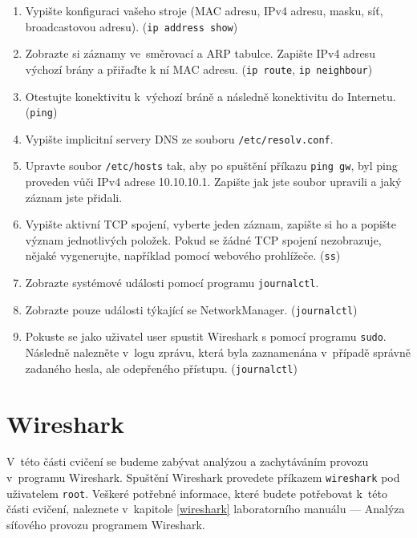 \begin{enumerate}
\item Vypište konfiguraci vašeho stroje (MAC adresu, IPv4 adresu, masku, síť,
  broadcastovou adresu). ({\tt ip address show})
\item Zobrazte si záznamy ve~směrovací a ARP tabulce. Zapište IPv4 adresu
  výchozí brány a přiřaďte k ní MAC adresu. ({\tt ip route}, {\tt ip neighbour})
\item Otestujte konektivitu k~výchozí bráně a následně konektivitu do Internetu.
  ({\tt ping})
\item Vypište implicitní servery DNS ze souboru {\tt /etc/resolv.conf}.
\item Upravte soubor {\tt /etc/hosts} tak, aby po spuštění příkazu \texttt{ping gw}, byl ping proveden vůči IPv4 adrese 10.10.10.1. Zapište jak jste soubor upravili a jaký záznam jste přidali.
\item Vypište aktivní TCP spojení, vyberte jeden záznam, zapište si ho a popište
  význam jednotlivých položek. Pokud se žádné TCP spojení nezobrazuje, nějaké
    vygenerujte, například pomocí webového prohlížeče. ({\tt ss})
\item Zobrazte systémové události pomocí programu \texttt{journalctl}.
\item Zobrazte pouze události týkající se NetworkManager. (\texttt{journalctl})
\item Pokuste se jako uživatel user spustit Wireshark s pomocí programu \texttt{sudo}. Následně nalezněte v~logu zprávu, která byla zaznamenána v~případě správně zadaného hesla, ale odepřeného přístupu. (\texttt{journalctl})

\end{enumerate}

\section{Wireshark}
V~této části cvičení se budeme zabývat analýzou a zachytáváním provozu
v~programu Wireshark. Spuštění Wireshark provedete příkazem \texttt{wireshark}
pod uživatelem \texttt{root}. Veškeré potřebné informace, které budete
potřebovat k~této části cvičení, naleznete v~kapitole \ref{wireshark} laboratorního manuálu
--- Analýza síťového provozu programem Wireshark.

